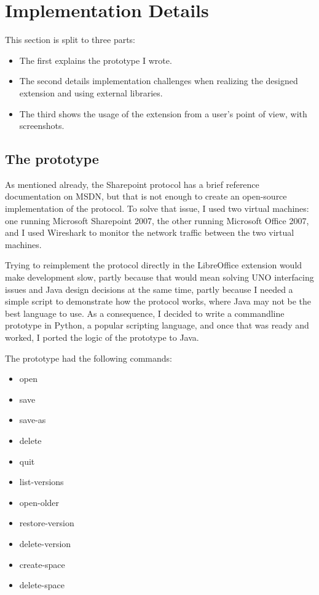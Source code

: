 \section{Implementation Details}

This section is split to three parts:

\begin{itemize}
\item The first explains the prototype I wrote.
\item The second details implementation challenges when realizing the designed extension and using external libraries.
\item The third shows the usage of the extension from a user's point of view, with screenshots.
\end{itemize}

\subsection{The prototype}

As mentioned already, the Sharepoint protocol has a brief reference
documentation on MSDN, but that is not enough to create an open-source
implementation of the protocol. To solve that issue, I used two virtual
machines: one running Microsoft Sharepoint 2007, the other running Microsoft
Office 2007, and I used Wireshark\cite{wireshark} to monitor the network
traffic between the two virtual machines.

Trying to reimplement the protocol directly in the LibreOffice extension would
make development slow, partly because that would mean solving UNO interfacing
issues and Java design decisions at the same time, partly because I needed a
simple script to demonstrate how the protocol works, where Java may not be the
best language to use. As a consequence, I decided to write a commandline
prototype in Python, a popular scripting language, and once that was ready and
worked, I ported the logic of the prototype to Java.

The prototype had the following commands:

\begin{itemize}
\item open
\item save
\item save-as
\item delete
\item quit
\item list-versions
\item open-older
\item restore-version
\item delete-version
\item create-space
\item delete-space
\end{itemize}

